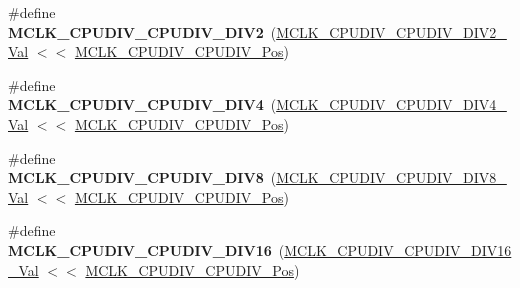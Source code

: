 \begin{DoxyCompactItemize}
\item 
\hypertarget{group___s_a_m_l21___m_c_l_k_ga467cc69309bf25c7896a848784ce2e9a}{}\#define {\bfseries M\+C\+L\+K\+\_\+\+C\+P\+U\+D\+I\+V\+\_\+\+C\+P\+U\+D\+I\+V\+\_\+\+D\+I\+V2}~(\hyperlink{group___s_a_m_l21___m_c_l_k_ga15f305d7ac6e3dec87c96ef1636d1708}{M\+C\+L\+K\+\_\+\+C\+P\+U\+D\+I\+V\+\_\+\+C\+P\+U\+D\+I\+V\+\_\+\+D\+I\+V2\+\_\+\+Val}   $<$$<$ \hyperlink{group___s_a_m_l21___m_c_l_k_gae6faf0af5e1e22725e3c3080e2b94af7}{M\+C\+L\+K\+\_\+\+C\+P\+U\+D\+I\+V\+\_\+\+C\+P\+U\+D\+I\+V\+\_\+\+Pos})\label{group___s_a_m_l21___m_c_l_k_ga467cc69309bf25c7896a848784ce2e9a}

\item 
\hypertarget{group___s_a_m_l21___m_c_l_k_gab1f0cc1e1a3778b5a239c9cff1c5223f}{}\#define {\bfseries M\+C\+L\+K\+\_\+\+C\+P\+U\+D\+I\+V\+\_\+\+C\+P\+U\+D\+I\+V\+\_\+\+D\+I\+V4}~(\hyperlink{group___s_a_m_l21___m_c_l_k_gaaaddab15620e9b154890594aef095ae3}{M\+C\+L\+K\+\_\+\+C\+P\+U\+D\+I\+V\+\_\+\+C\+P\+U\+D\+I\+V\+\_\+\+D\+I\+V4\+\_\+\+Val}   $<$$<$ \hyperlink{group___s_a_m_l21___m_c_l_k_gae6faf0af5e1e22725e3c3080e2b94af7}{M\+C\+L\+K\+\_\+\+C\+P\+U\+D\+I\+V\+\_\+\+C\+P\+U\+D\+I\+V\+\_\+\+Pos})\label{group___s_a_m_l21___m_c_l_k_gab1f0cc1e1a3778b5a239c9cff1c5223f}

\item 
\hypertarget{group___s_a_m_l21___m_c_l_k_ga5c62ac1166efd68988989b2a17aa5bfc}{}\#define {\bfseries M\+C\+L\+K\+\_\+\+C\+P\+U\+D\+I\+V\+\_\+\+C\+P\+U\+D\+I\+V\+\_\+\+D\+I\+V8}~(\hyperlink{group___s_a_m_l21___m_c_l_k_ga7b62ecc83e4fa31634f6e69d8a32c8b5}{M\+C\+L\+K\+\_\+\+C\+P\+U\+D\+I\+V\+\_\+\+C\+P\+U\+D\+I\+V\+\_\+\+D\+I\+V8\+\_\+\+Val}   $<$$<$ \hyperlink{group___s_a_m_l21___m_c_l_k_gae6faf0af5e1e22725e3c3080e2b94af7}{M\+C\+L\+K\+\_\+\+C\+P\+U\+D\+I\+V\+\_\+\+C\+P\+U\+D\+I\+V\+\_\+\+Pos})\label{group___s_a_m_l21___m_c_l_k_ga5c62ac1166efd68988989b2a17aa5bfc}

\item 
\hypertarget{group___s_a_m_l21___m_c_l_k_ga81c373371d475d9edc93bda1067fa18b}{}\#define {\bfseries M\+C\+L\+K\+\_\+\+C\+P\+U\+D\+I\+V\+\_\+\+C\+P\+U\+D\+I\+V\+\_\+\+D\+I\+V16}~(\hyperlink{group___s_a_m_l21___m_c_l_k_ga0cfaa19877c910fea42fc0ac0f5aad9f}{M\+C\+L\+K\+\_\+\+C\+P\+U\+D\+I\+V\+\_\+\+C\+P\+U\+D\+I\+V\+\_\+\+D\+I\+V16\+\_\+\+Val}  $<$$<$ \hyperlink{group___s_a_m_l21___m_c_l_k_gae6faf0af5e1e22725e3c3080e2b94af7}{M\+C\+L\+K\+\_\+\+C\+P\+U\+D\+I\+V\+\_\+\+C\+P\+U\+D\+I\+V\+\_\+\+Pos})\label{group___s_a_m_l21___m_c_l_k_ga81c373371d475d9edc93bda1067fa18b}


\end{DoxyCompactItemize}
